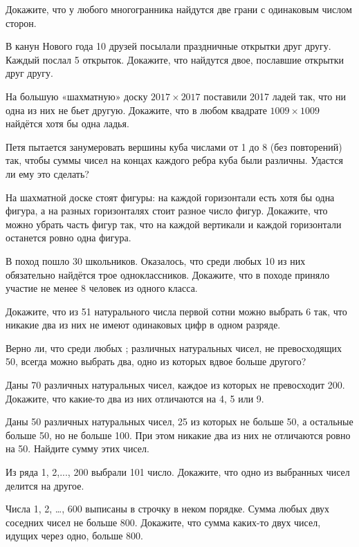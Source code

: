 \documentclass[12pt,a4paper]{article}
\begin{document}

 Докажите, что у любого многогранника найдутся две грани с одинаковым числом сторон.

 В канун Нового года 10 друзей посылали праздничные открытки друг другу. Каждый послал 5 открыток. Докажите, что найдутся двое, пославшие открытки друг другу.

  На большую «шахматную» доску $2017\times 2017$ поставили 2017 ладей так, что ни одна из них не бьет другую. Докажите, что в любом квадрате
$1009 \times 1009$ найдётся хотя бы одна ладья.

  Петя пытается занумеровать вершины куба числами от 1 до 8 (без повторений) так, чтобы суммы чисел на концах каждого ребра куба были различны. Удастся ли ему это сделать?

  На шахматной доске стоят фигуры: на каждой горизонтали есть хотя бы одна фигура, а на разных горизонталях стоит разное число фигур. Докажите, что можно убрать часть фигур так, что на каждой вертикали и каждой горизонтали останется ровно одна фигура.

 В поход пошло 30 школьников. Оказалось, что среди любых 10 из них обязательно найдётся трое одноклассников. Докажите, что в походе приняло участие не менее 8 человек из одного класса.

  Докажите, что из 51 натурального числа первой сотни можно выбрать 6 так, что никакие два из них не имеют одинаковых цифр в одном разряде.

 Верно ли, что среди любых ;  различных натуральных чисел, не превосходящих 50, всегда можно выбрать два, одно из которых вдвое больше другого?

 Даны 70 различных натуральных чисел, каждое из которых не превосходит 200. Докажите, что какие-то два из них отличаются на 4, 5 или 9.





  Даны 50 различных натуральных чисел, 25 из которых не больше 50, а остальные больше 50, но не больше 100. При этом никакие два из них не отличаются ровно на 50. Найдите сумму этих чисел.


  Из ряда 1, 2,..., 200 выбрали 101 число. Докажите, что одно из выбранных чисел делится на другое.

  Числа 1, 2, \ldots, 600 выписаны в строчку в неком порядке. Сумма любых двух соседних чисел не больше 800. Докажите, что сумма каких-то двух чисел, идущих через одно, больше 800.
\end{document}

